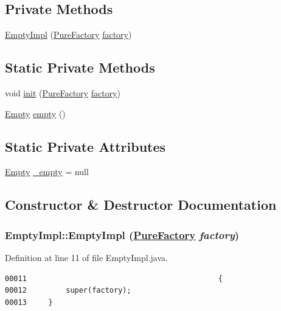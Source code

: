 \subsection*{Private Methods}
\begin{CompactItemize}
\item 
\hyperlink{classEmptyImpl_c0}{Empty\-Impl} (\hyperlink{classPureFactory}{Pure\-Factory} \hyperlink{classDataImpl_o0}{factory})
\end{CompactItemize}
\subsection*{Static Private Methods}
\begin{CompactItemize}
\item 
void \hyperlink{classEmptyImpl_f0}{init} (\hyperlink{classPureFactory}{Pure\-Factory} \hyperlink{classDataImpl_o0}{factory})
\item 
\hyperlink{interfaceEmpty}{Empty} \hyperlink{classEmptyImpl_f1}{empty} ()
\end{CompactItemize}
\subsection*{Static Private Attributes}
\begin{CompactItemize}
\item 
\hyperlink{interfaceEmpty}{Empty} \hyperlink{classEmptyImpl_r0}{\_\-empty} = null
\end{CompactItemize}


\subsection{Constructor \& Destructor Documentation}
\hypertarget{classEmptyImpl_c0}{
\subsubsection[EmptyImpl]{\setlength{\rightskip}{0pt plus 5cm}Empty\-Impl::Empty\-Impl (\hyperlink{classPureFactory}{Pure\-Factory} {\em factory})}}
\label{classEmptyImpl_c0}




Definition at line 11 of file Empty\-Impl.java.\footnotesize\begin{verbatim}00011                                            {
00012         super(factory);
00013     }
\end{verbatim}\normalsize 


